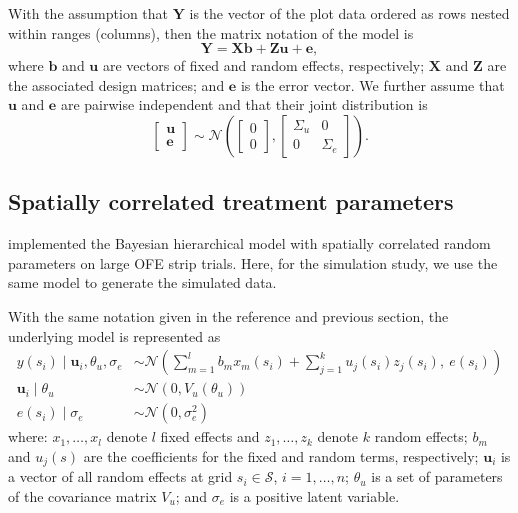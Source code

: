 \documentclass[a4paper]{article} 	%
\newcommand{\N}{\mathcal{N}}
\begin{document}
	
With the assumption that $\bm{Y}$ is the vector of the plot data ordered as rows nested within ranges (columns), then the matrix notation of the model is 
\begin{equation}\label{eq:modelmatrix}
	\bm{Y} = \bm{X}\bm{b}+\bm{Z}\bm{u}+\bm{e},
\end{equation}
where $\bm{b}$ and $\bm{u}$ are vectors of fixed and random effects, respectively; $\bm{X}$ and $\bm{Z}$ are the associated design matrices; and $\bm{e}$ is the error vector. We further assume that $\bm{u}$ and $\bm{e}$ are pairwise independent and that their joint distribution is 
\begin{equation}\label{eq:covariance}
	\begin{bmatrix}
		\bm{u} \\ \bm{e}
	\end{bmatrix} \sim \N\left( \begin{bmatrix}
		0\\0 \end{bmatrix}, \begin{bmatrix}
		\Sigma_u & 0 \\ 0 & \Sigma_e
	\end{bmatrix}\right). 
\end{equation}
	
	
	
\subsection{Spatially correlated treatment parameters}\label{sec:spatial}

\textcite{Cao2022Bayesian} implemented the Bayesian hierarchical model with spatially correlated random parameters on large OFE strip trials. Here, for the simulation study, we use the same model to generate the simulated data. 
	
With the same notation given in the reference and previous section, the underlying model is represented as 
\begin{equation}\label{eq:underlying}
	\begin{split}
		y(s_i)\mid \bm{u}_i,\theta_u,\sigma_e &\sim \N\left( \sum_{m=1}^{l}b_m x_m(s_i) + \sum_{j=1}^{k}u_j(s_i)z_j(s_i),~e(s_i)\right) \\
		\bm{u}_i \mid \theta_u &\sim \N(0,V_u(\theta_u))\\
		e(s_i) \mid \sigma_e &\sim \N(0,\sigma_e^2) 
	\end{split}
\end{equation}
where: $x_1,\ldots, x_l$ denote $l$ fixed effects and $z_1,\ldots, z_k$ denote $k$ random effects; $b_m$ and $u_j(s)$ are the coefficients for the fixed and random terms, respectively; $\bm{u}_i$ is a vector of all random effects at grid $s_i\in\mathcal{S}$, $i=1,\ldots,n$; $\theta_u$ is a set of parameters of the covariance matrix $V_u$; and $\sigma_e$ is a positive latent variable. 
	
\end{document}
